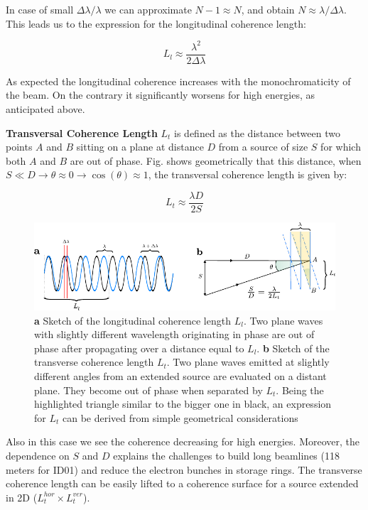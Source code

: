 In case of small $\Delta \lambda / \lambda $ we can approximate $N-1 \approx N$, and obtain $N \approx \lambda / \Delta \lambda$. 
This leads us to the expression for the longitudinal coherence length: 

\begin{equation}
    L_l \approx \frac{\lambda^2}{2\Delta \lambda}
\end{equation}

As expected the longitudinal coherence increases with the monochromaticity of the beam. On the contrary it significantly 
worsens for high energies, as anticipated above. 

\textbf{Transversal Coherence Length} $L_t$ is defined as the distance between two points $A$ and $B$ sitting on a plane at distance $D$ from a 
source of size $ S$ for which both $A$ and $B$ are out of phase. Fig. shows geometrically that this distance, 
when $S \ll D \rightarrow \theta \approx 0 \rightarrow \cos(\theta)\approx 1$, the transversal coherence length is given by: 

\begin{equation}
    L_t \approx \frac{\lambda D}{2 S}
\end{equation}

\begin{figure}[H]
    \centering
    \includegraphics[width=\textwidth]{figures/Intro/coherence.pdf}
    \caption{\textbf{a} Sketch of the longitudinal coherence length $L_l$. Two plane waves with slightly different wavelength 
    originating in phase are out of phase after propagating over a distance equal to $L_l$. \textbf{b} Sketch of the 
    transverse coherence length $L_t$. Two plane waves emitted at slightly different angles from an extended source 
    are evaluated on a distant plane. They become out of phase when separated by $L_t$. 
    Being the highlighted triangle similar to the bigger one in black, an expression for $L_t$ can be derived from 
    simple geometrical considerations}
    \label{fig:coherence}
\end{figure}

Also in this case we see the coherence decreasing for high energies.
Moreover, the dependence on $S$ and $D$ explains the challenges to build long beamlines (118 meters for ID01) and
reduce the electron bunches in storage rings. The transverse coherence length can be easily lifted to a coherence surface 
for a source extended in 2D ($L_t^{hor} \times L_t^{ver}$).\\

